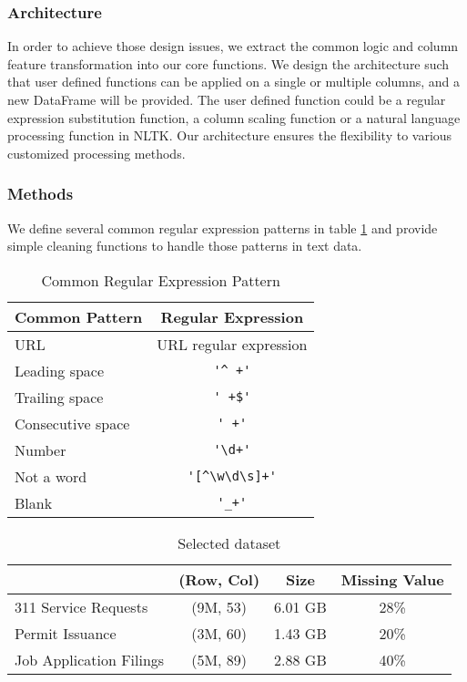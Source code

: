 \documentclass[sigconf]{acmart}
\begin{document}
\subsubsection{Architecture}
In order to achieve those design issues, we extract the common logic and column feature transformation into our core functions. We design the architecture such that user defined functions can be applied on a single or multiple columns, and a new DataFrame will be provided. The user defined function could be a regular expression substitution function, a column scaling function or a natural language processing function in NLTK. Our architecture ensures the flexibility to various customized processing methods.

\subsubsection{Methods}
We define several common regular expression patterns in table \ref{tab:reg} and provide simple cleaning functions to handle those patterns in text data.
\begin{table}
\caption{Common Regular Expression Pattern}   
\label{tab:reg}
\begin{tabular}{lc}
	Common Pattern & Regular Expression \\
\hline
	URL & URL regular expression\cite{url} \\
	Leading space & \verb!'^ +'! \\
	Trailing space & \verb!' +$'! \\
	Consecutive space & \verb!' +'! \\
	Number & \verb!'\d+'!  \\
	Not a word & \verb!'[^\w\d\s]+'! \\
	Blank & \verb!'_+'!
\end{tabular}   
\end{table}

\begin{table}
\caption{Selected dataset}   
\label{tab:dataset}
\begin{tabular}{lccc}   
 		                 & (Row, Col)  & Size      & Missing Value  \\  
\hline
 311 Service Requests   & (9M, 53)     & 6.01 GB  & 28\%            \\ 
 Permit Issuance            & (3M, 60)     & 1.43 GB  & 20\%             \\  
 Job Application Filings   & (5M, 89)     & 2.88 GB  & 40\%             \\ 

\end{tabular}   
\end{table}
\end{document}
